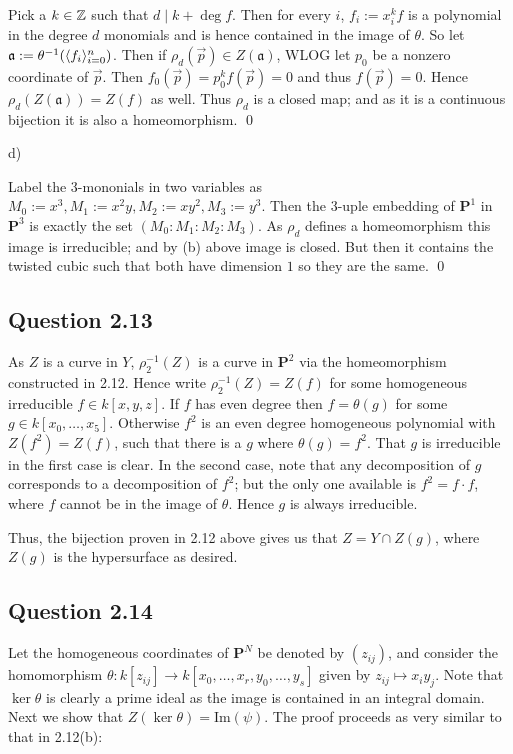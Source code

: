 \documentclass{article}
\begin{document}
Pick a $k \in \mathbb Z$ such that $d \mid k + \deg f$. Then for every $i$, $f_i := x_i^{k}f$ is a polynomial in the degree $d$ monomials and is hence contained in the image of $\theta$. So let $\mathfrak a := \theta^{-1}(\langle f_i\rangle_{i=0}^n)$. Then if $\rho_d(\vec p) \in Z(\mathfrak a)$, WLOG let $p_0$ be a nonzero coordinate of $\vec p$. Then $f_0(\vec p) = p_0^kf(\vec p) = 0$ and thus $f(\vec p) = 0$. Hence $\rho_d(Z(\mathfrak a)) = Z(f)$ as well. Thus $\rho_d$ is a closed map; and as it is a continuous bijection it is also a homeomorphism. \qed

\noindent d)

Label the 3-mononials in two variables as $M_0 := x^3, M_1:= x^2y, M_2:=xy^2, M_3 := y^3$. Then the 3-uple embedding of $\mathbf{P}^1$ in $\mathbf{P}^3$ is exactly the set $(M_0:M_1:M_2:M_3)$. As $\rho_d$ defines a homeomorphism this image is irreducible; and by (b) above image is closed. But then it contains the twisted cubic such that both have dimension $1$ so they are the same. \qed
\lspace

\subsection*{Question 2.13}

As $Z$ is a curve in $Y$, $\rho_2^{-1}(Z)$ is a curve in $\mathbf{P}^2$ via the homeomorphism constructed in 2.12. Hence write $\rho_2^{-1}(Z) = Z(f)$ for some homogeneous irreducible $f \in k[x,y,z]$. If $f$ has even degree then $f = \theta(g)$ for some $g \in k[x_0,\dots,x_5]$. Otherwise $f^2$ is an even degree homogeneous polynomial with $Z(f^2) = Z(f)$, such that there is a $g$ where $\theta(g) = f^2$. That $g$ is irreducible in the first case is clear. In the second case, note that any decomposition of $g$ corresponds to a decomposition of $f^2$; but the only one available is $f^2 = f \cdot f$, where $f$ cannot be in the image of $\theta$. Hence $g$ is always irreducible.

Thus, the bijection proven in 2.12 above gives us that $Z = Y \cap Z(g)$, where $Z(g)$ is the hypersurface as desired.
\lspace

\subsection*{Question 2.14}

Let the homogeneous coordinates of $\mathbf{P}^N$ be denoted by $(z_{ij})$, and consider the homomorphism $\theta: k[z_{ij}] \to k[x_0,\dots,x_r,y_0,\dots,y_s]$ given by $z_{ij} \mapsto x_iy_j$. Note that $\ker \theta$ is clearly a prime ideal as the image is contained in an integral domain. Next we show that $Z(\ker \theta) = \text{Im}(\psi)$. The proof proceeds as very similar to that in 2.12(b):
\end{document}
